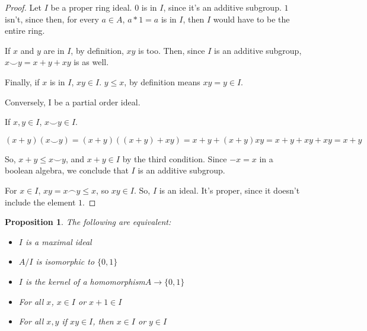 \documentclass{article}
\newtheorem*{proposition}{Proposition}
\begin{document}
      \begin{proof}

      Let $I$ be a proper ring ideal. $0$ is in $I$, since it's an additive
      subgroup. $1$ isn't, since then, for every $a \in A$, $a*1 = a$ is in $I$,
      then $I$ would have to be the entire ring.

      If $x$ and $y$ are in $I$, by definition, $xy$ is too. Then, since $I$ is
      an additive subgroup, $x \smile y = x + y + xy$ is as well.

      Finally, if $x$ is in $I$, $xy \in I$. $y \leq x$, by definition means $xy
      = y \in I$.

      Conversely, I be a partial order ideal.

      If $x, y \in I$, $x \smile y \in I$.

      \[(x+y)(x \smile y) = (x+y)((x+y)+xy) = x + y + (x+y)xy = x + y + xy + xy
      = x + y\]

      So, $x+y
      \leq x \smile y$, and $x+y \in I$ by the third condition. Since $-x = x$
      in a boolean algebra, we conclude that $I$ is an additive subgroup.

      For $x \in I$, $xy = x \frown y \leq x$, so $xy \in I$. So, $I$ is an
      ideal. It's proper, since it doesn't include the element $1$.
      \end{proof}

      \begin{proposition}
        The following are equivalent:

        \begin{itemize}
          \item[(1)] $I$ is a maximal ideal
          \item[(2)] $A/I$ is isomorphic to $\{0,1\}$
          \item[(3)] $I$ is the kernel of a homomorphism$ A \rightarrow \{0,1\}$
          \item[(4)] For all $x$, $x \in I$ or  $x+1 \in I$
          \item[(5)] For all $x,y$ if $xy \in I$, then $x \in I$ or $y \in I$
        \end{itemize}
      \end{proposition}
\end{document}
